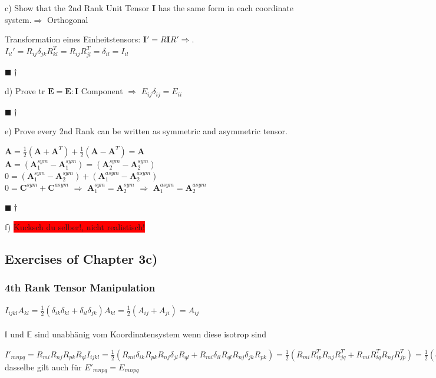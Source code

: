 \documentclass[a4paper]{scrartcl}
\newcommand{\qed}{\begin{flushright}
$\blacksquare \dagger$ \end{flushright}}
\begin{document}
c) Show that the 2nd Rank Unit Tensor $\mathbf{I}$ has the same form in each
coordinate system.$\Rightarrow$ Orthogonal

Transformation eines Einheitstensors: $\mathbf{I}'=R\mathbf{I}R'\Rightarrow$.
$I_{il}'=R_{ij}\delta_{jk}R_{kl}^T = R_{ij}R_{jl}^T=\delta_{il}=I_{il}$ \qed



d) Prove tr $\mathbf{E}=\mathbf{E : I}$
Component $\Rightarrow$ $E_{ij}\delta_{ij}=E_{ii}$ \qed

e) Prove every 2nd Rank can be written as symmetric and asymmetric tensor.

$\mathbf{A}=\frac{1}{2}\left(\mathbf{A} + \mathbf{A}^T\right)+
\frac{1}{2}\left(\mathbf{A}-\mathbf{A}^T\right) = \mathbf{A}$ \\
$\mathbf{A}=\left(\mathbf{A}_1^{sym}-\mathbf{A}_1^{sym}\right)=\left(\mathbf{A}_2^{sym}-\mathbf{A}_2^{sym}\right)$
\\
$0=\left(\mathbf{A}_1^{sym}-\mathbf{A}_2^{sym}\right)+\left(\mathbf{A}_1^{asym}-\mathbf{A}_2^{asym}\right)$
\\
$0=\mathbf{C}^{sym}+\mathbf{C}^{asym}$ $\Rightarrow$
$\mathbf{A}_1^{sym}=\mathbf{A}_2^{sym}$ $\Rightarrow$
$\mathbf{A}_1^{asym}=\mathbf{A}_2^{asym}$ \qed


f) \colorbox{red}{Kucksch du selber!, nicht realistisch!}




\subsection{Exercises of Chapter 3c)}

\subsubsection{4th Rank Tensor Manipulation}


$I_{ijkl}A_{kl}=\frac{1}{2}(\delta_{ik}\delta_{kl}+\delta_{il}\delta_{jk})A_{kl}=\frac{1}{2}(A_{ij}+A_{ji})=A_{ij}$
\\
\\
$ \mathbb{I} $ und $ \mathbb{E} $ sind unabhänig vom Koordinatensystem wenn diese isotrop sind

$ I'_{mnpq}=R_{mi}R_{nj}R_{pk}R_{ql}I_{ijkl} = \frac{1}{2}(R_{mi}\delta_{ik}R_{pk}R_{nj}\delta_{jl}R_{ql} + R_{mi}\delta_{il}R_{ql}R_{nj}\delta_{jk}R_{pk})= \frac{1}{2}(R_{mi}R^T_{ip}R_{nj}R^T_{jq}+R_{mi}R^T_{iq}R_{nj}R^T_{jp})= \frac{1}{2}(\delta_{mp}\delta_{mq}\delta_{np})=I_{mnpq} $ dasselbe gilt auch für $ E'_{mnpq}=E_{mnpq}$
\end{document}
